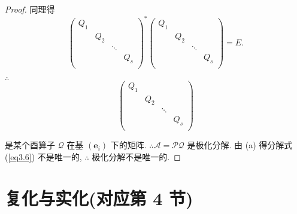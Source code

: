 \documentclass{ctexart}
\begin{document}
\begin{proof}
    同理得
    \[\begin{pmatrix}
        Q_1 \\
        & Q_2 \\
        && \ddots \\
        &&& Q_s \\
    \end{pmatrix}^*\begin{pmatrix}
        Q_1 \\
        & Q_2 \\
        && \ddots \\
        &&& Q_s \\
    \end{pmatrix}=E.\]

    $\therefore$
    \[\begin{pmatrix}
        Q_1 \\
        & Q_2 \\
        && \ddots \\
        &&& Q_s \\
    \end{pmatrix}\]

    是某个酉算子 $\mathcal{Q}$ 在基 $(\boldsymbol{e}_i)$ 下的矩阵. $\therefore\mathcal{A}=\mathcal{PQ}$ 是极化分解. 由 (a) 得分解式 (\ref{eq3.6}) 不是唯一的, $\therefore$ 极化分解不是唯一的.
\end{proof}
\section{复化与实化(对应第 4 节)}
\end{document}
